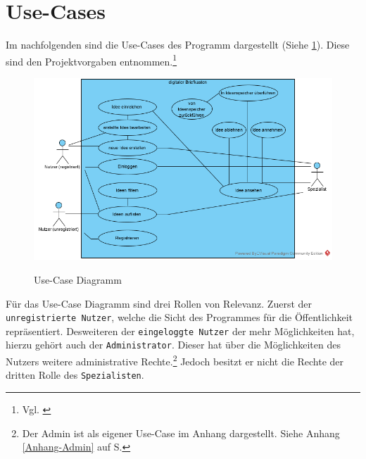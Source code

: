 
\section{Use-Cases}

Im nachfolgenden sind die Use-Cases des Programm dargestellt (Siehe \cref{fig:usecases}).
Diese sind den Projektvorgaben entnommen.\footnote{Vgl. \cite{Vorgaben2020}}

\begin{figure}[hbt]\label{usecase}
\centering
\begin{minipage}[t]{1\textwidth}
    \caption{Use-Case Diagramm}
    \includegraphics[width=1\textwidth]{img/createAnAccountWithSpamMailAccountYouSucker.png}\\
    \label{fig:usecases}
\end{minipage}
\end{figure}

Für das Use-Case Diagramm sind drei Rollen von Relevanz.
Zuerst der \texttt{unregistrierte Nutzer}, welche die Sicht des Programmes für die Öffentlichkeit repräsentiert.
Desweiteren der \texttt{eingeloggte Nutzer} der mehr Möglichkeiten hat, hierzu gehört auch der \texttt{Administrator}.
Dieser hat über die Möglichkeiten des Nutzers weitere administrative Rechte.\footnote{Der Admin ist als eigener Use-Case im Anhang dargestellt. Siehe Anhang \ref{Anhang-Admin} auf S.\pageref{Anhang-Admin}}
Jedoch besitzt er nicht die Rechte der dritten Rolle des \texttt{Spezialisten}.\\

